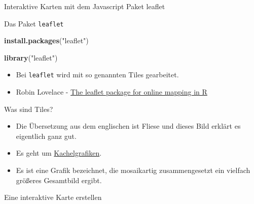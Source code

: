 \documentclass[ignorenonframetext,]{beamer}
\newenvironment{Shaded}{}{}
\newcommand{\KeywordTok}[1]{\textcolor[rgb]{0.00,0.44,0.13}{\textbf{{#1}}}}
\newcommand{\DataTypeTok}[1]{\textcolor[rgb]{0.56,0.13,0.00}{{#1}}}
\newcommand{\StringTok}[1]{\textcolor[rgb]{0.25,0.44,0.63}{{#1}}}
\newcommand{\CommentTok}[1]{\textcolor[rgb]{0.38,0.63,0.69}{\textit{{#1}}}}
\newcommand{\NormalTok}[1]{{#1}}
\providecommand{\tightlist}{%
\setlength{\itemsep}{0pt}\setlength{\parskip}{0pt}}
\begin{document}
\begin{frame}[fragile]{Interaktive Karten mit dem Javascript Paket
leaflet}
\begin{block}{Das Paket \texttt{leaflet}}
\begin{Shaded}
\begin{Highlighting}[]
\KeywordTok{install.packages}\NormalTok{(}\StringTok{"leaflet"}\NormalTok{)}
\end{Highlighting}
\end{Shaded}

\begin{Shaded}
\begin{Highlighting}[]
\KeywordTok{library}\NormalTok{(}\StringTok{"leaflet"}\NormalTok{)}
\end{Highlighting}
\end{Shaded}

\begin{itemize}
\item
  Bei \texttt{leaflet} wird mit so genannten Tiles gearbeitet.
\item
  Robin Lovelace -
  \href{http://robinlovelace.net/r/2015/02/01/leaflet-r-package.html}{The
  leaflet package for online mapping in R}
\end{itemize}

\end{block}

\begin{block}{Was sind Tiles?}

\begin{itemize}
\tightlist
\item
  Die Übersetzung aus dem englischen ist Fliese und dieses Bild erklärt
  es eigentlich ganz gut.
\item
  Es geht um
  \href{https://de.wikipedia.org/wiki/Kachelgrafik}{Kachelgrafiken}.
\item
  Es ist eine Grafik bezeichnet, die mosaikartig zusammengesetzt ein
  vielfach größeres Gesamtbild ergibt.
\end{itemize}

\end{block}

\begin{block}{Eine interaktive Karte erstellen}

\begin{Shaded}
\end{Shaded}


\end{block}
\end{frame}
\end{document}
